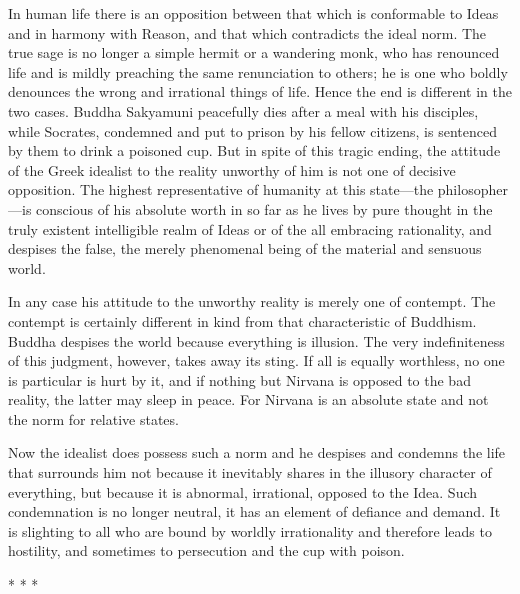 \begin{quotex}

In human life there is an opposition between that which is conformable to Ideas and in harmony with Reason, and that which contradicts the ideal norm. The true sage is no longer a simple hermit or a wandering monk, who has renounced life and is mildly preaching the same renunciation to others; he is one who boldly denounces the wrong and irrational things of life. Hence the end is different in the two cases. Buddha Sakyamuni peacefully dies after a meal with his disciples, while Socrates, condemned and put to prison by his fellow citizens, is sentenced by them to drink a poisoned cup. But in spite of this tragic ending, the attitude of the Greek idealist to the reality unworthy of him is not one of decisive opposition. The highest representative of humanity at this state---the philosopher---is conscious of his absolute worth in so far as he lives by pure thought in the truly existent intelligible realm of Ideas or of the all embracing rationality, and despises the false, the merely phenomenal being of the material and sensuous world.

In any case his attitude to the unworthy reality is merely one of contempt. The contempt is certainly different in kind from that characteristic of Buddhism. Buddha despises the world because everything is illusion. The very indefiniteness of this judgment, however, takes away its sting. If all is equally worthless, no one is particular is hurt by it, and if nothing but Nirvana is opposed to the bad reality, the latter may sleep in peace. For Nirvana is an absolute state and not the norm for relative states.

Now the idealist does possess such a norm and he despises and condemns the life that surrounds him not because it inevitably shares in the illusory character of everything, but because it is abnormal, irrational, opposed to the Idea. Such condemnation is no longer neutral, it has an element of defiance and demand. It is slighting to all who are bound by worldly irrationality and therefore leads to hostility, and sometimes to persecution and the cup with poison.
\end{quotex}




\begin{center}* * *\end{center}


